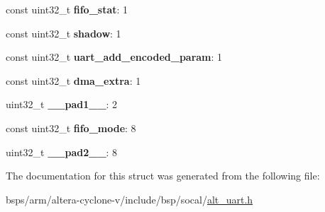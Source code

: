 \begin{DoxyCompactItemize}
\mbox{\label{structALT__UART__CPR__s_ae2ab21b29f292101b988370630429514}} 
const uint32\+\_\+t {\bfseries fifo\+\_\+stat}\+: 1
\item 
\mbox{\label{structALT__UART__CPR__s_afb57e26858b84dc0ff1da40ea533efa3}} 
const uint32\+\_\+t {\bfseries shadow}\+: 1
\item 
\mbox{\label{structALT__UART__CPR__s_a780f68a4ecdf6b5fb20b787ffdff5e3c}} 
const uint32\+\_\+t {\bfseries uart\+\_\+add\+\_\+encoded\+\_\+param}\+: 1
\item 
\mbox{\label{structALT__UART__CPR__s_a2f88494dcd672ac91c011f17bd3ceef1}} 
const uint32\+\_\+t {\bfseries dma\+\_\+extra}\+: 1
\item 
\mbox{\label{structALT__UART__CPR__s_a6855b7f0aa9423f28c9cb2bf64421fad}} 
uint32\+\_\+t {\bfseries \+\_\+\+\_\+pad1\+\_\+\+\_\+}\+: 2
\item 
\mbox{\label{structALT__UART__CPR__s_a910ea882ef266d0373dc3f43af4ba049}} 
const uint32\+\_\+t {\bfseries fifo\+\_\+mode}\+: 8
\item 
\mbox{\label{structALT__UART__CPR__s_a4405f448040bcc3b13a2179516526722}} 
uint32\+\_\+t {\bfseries \+\_\+\+\_\+pad2\+\_\+\+\_\+}\+: 8
\end{DoxyCompactItemize}


The documentation for this struct was generated from the following file\+:\begin{DoxyCompactItemize}
\item 
bsps/arm/altera-\/cyclone-\/v/include/bsp/socal/\mbox{\hyperlink{alt__uart_8h}{alt\+\_\+uart.\+h}}\end{DoxyCompactItemize}

